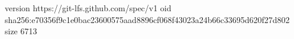 version https://git-lfs.github.com/spec/v1
oid sha256:e70356f9c1e0bac23600575aad8896cf068f43023a24b66c33695d620f27d802
size 6713

